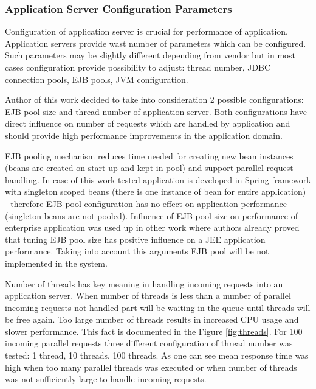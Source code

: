 \documentclass[10pt,a4paper]{article}
\begin{document}
\subsubsection{Application Server Configuration Parameters}

Configuration of application server is crucial for performance of application. Application servers provide wast number of parameters which can be configured. Such parameters may be slightly different depending from vendor but in most cases configuration provide possibility to adjust: thread number, JDBC connection pools, EJB pools, JVM configuration. 

Author of this work decided to take into consideration 2 possible configurations: EJB pool size and thread number of application server. Both configurations have direct influence on number of requests which are handled by application and should provide high performance improvements in the application domain. 

EJB pooling mechanism reduces time needed for creating new bean instances (beans are created on start up and kept in pool) and support parallel request handling. In case of this work tested application is developed in Spring framework with singleton scoped beans (there is one instance of bean for entire application) - therefore EJB pool configuration has no effect on application performance (singleton beans are not pooled). Influence of EJB pool size on performance of enterprise application was used up in other work \cite{autotuning} where authors already proved that tuning EJB pool size has positive influence on a JEE application performance. Taking into account this arguments EJB pool will be not implemented in the system. 

Number of threads has key meaning in handling incoming requests into an application server. When number of threads is less than a number of parallel incoming requests not handled part will be waiting in the queue until threads will be free again. Too large number of threads results in increased CPU usage and slower performance. This fact is documented in the Figure \ref{fig:threads}. For 100 incoming parallel requests three different configuration of thread number was tested: 1 thread, 10 threads, 100 threads. As one can see mean response time was high when too many parallel threads was executed or when number of threads was not sufficiently large to handle incoming requests.    
\end{document}
